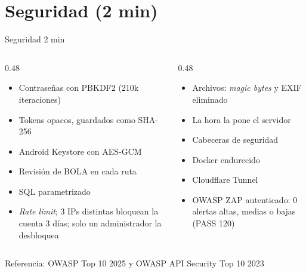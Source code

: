 \section{Seguridad (2 min)}

\begin{frame}{Seguridad \hfill\small 2 min}
  \begin{columns}[T]
    \begin{column}{0.48\textwidth}
      \begin{itemize}
        \item Contraseñas con PBKDF2 (210k iteraciones)
        \item Tokens opacos, guardados como SHA-256
        \item Android Keystore con AES-GCM
        \item Revisión de BOLA en cada ruta
        \item SQL parametrizado
        \item \textit{Rate limit}; 3 IPs distintas bloquean la cuenta 3 días; solo un administrador la desbloquea
      \end{itemize}
    \end{column}
    \begin{column}{0.48\textwidth}
      \begin{itemize}
        \item Archivos: \textit{magic bytes} y EXIF eliminado
        \item La hora la pone el servidor
        \item Cabeceras de seguridad
        \item Docker endurecido
        \item Cloudflare Tunnel
        \item OWASP ZAP autenticado: 0 alertas altas, medias o bajas (PASS 120)
      \end{itemize}
    \end{column}
  \end{columns}
  \vspace{0.8em}
  \centering Referencia: OWASP Top 10 2025 y OWASP API Security Top 10 2023
\end{frame}
